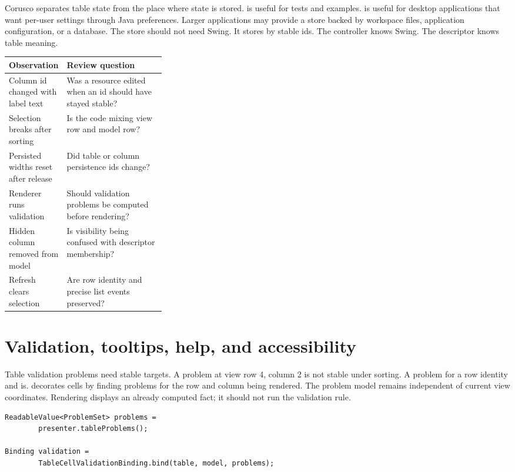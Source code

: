 Corusco separates table state from the place where state is stored.
 is useful for tests and examples.
 is useful for desktop applications that want
per-user settings through Java preferences. Larger applications may provide a
store backed by workspace files, application configuration, or a database. The
store should not need Swing. It stores  by stable ids. The
controller knows Swing. The descriptor knows table meaning.

\begin{tabularx}{0.96\linewidth}{@{}p{0.31\linewidth}X@{}}
\toprule
Observation & Review question\\
\midrule
Column id changed with label text & Was a resource edited when an id should have stayed stable?\\
Selection breaks after sorting & Is the code mixing view row and model row?\\
Persisted widths reset after release & Did table or column persistence ids change?\\
Renderer runs validation & Should validation problems be computed before rendering?\\
Hidden column removed from model & Is visibility being confused with descriptor membership?\\
Refresh clears selection & Are row identity and precise list events preserved?\\
\bottomrule
\end{tabularx}

\section{Validation, tooltips, help, and accessibility}

Table validation problems need stable targets. A problem at view row 4,
column 2 is not stable under sorting. A problem for a row identity and
 is.  decorates cells by
finding problems for the row and column being rendered. The problem model
remains independent of current view coordinates. Rendering displays an already
computed fact; it should not run the validation rule.

\begin{lstlisting}[caption={Cell validation observes structured problems.}]
ReadableValue<ProblemSet> problems =
        presenter.tableProblems();

Binding validation =
        TableCellValidationBinding.bind(table, model, problems);
\end{lstlisting}

